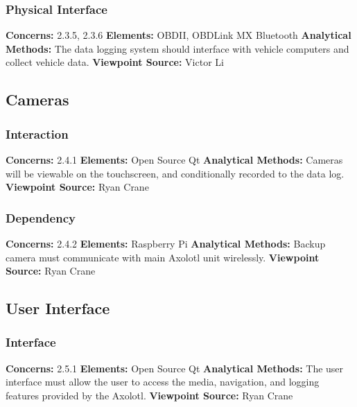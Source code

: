 \documentclass[onecolumn, draftclsnofoot,10pt, compsoc]{IEEEtran}
\begin{document}
\subsubsection{Physical Interface}
\textbf{Concerns:} 2.3.5, 2.3.6 \newline
\textbf{Elements:} OBDII, OBDLink MX Bluetooth \newline
\textbf{Analytical Methods:} The data logging system should interface with vehicle computers and collect vehicle data. \newline
\textbf{Viewpoint Source:} Victor Li

\subsection{Cameras}
\subsubsection{Interaction}
\textbf{Concerns:} 2.4.1 \newline
\textbf{Elements:} Open Source Qt \newline
\textbf{Analytical Methods:} Cameras will be viewable on the touchscreen, and conditionally recorded to the data log. \newline
\textbf{Viewpoint Source:} Ryan Crane

\subsubsection{Dependency}
\textbf{Concerns:} 2.4.2 \newline
\textbf{Elements:} Raspberry Pi \newline
\textbf{Analytical Methods:} Backup camera must communicate with main Axolotl unit wirelessly. \newline
\textbf{Viewpoint Source:} Ryan Crane

\subsection{User Interface}
\subsubsection{Interface}
\textbf{Concerns:} 2.5.1 \newline
\textbf{Elements:} Open Source Qt \newline
\textbf{Analytical Methods:} The user interface must allow the user to access the media, navigation, and logging features provided by the Axolotl. \newline
\textbf{Viewpoint Source:} Ryan Crane
\end{document}
